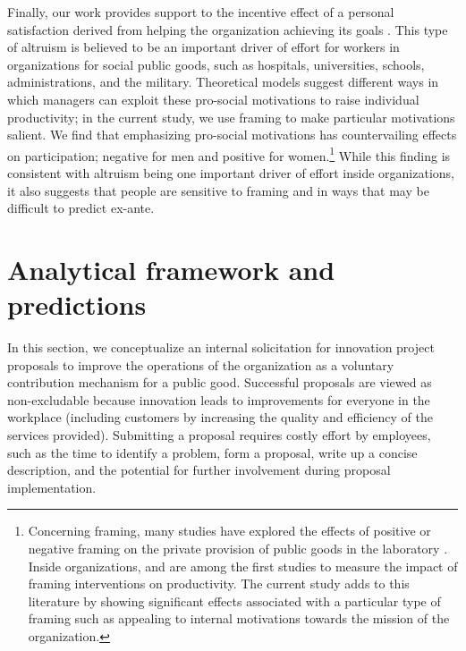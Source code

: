 \documentclass[12pt, titlepage]{article}
\begin{document}
Finally, our work provides support to the incentive effect of a personal
satisfaction derived from helping the organization achieving its goals
\citep{akerlof2005identity, besley2005competition, delfgaauw2005dedicated, delfgaauw2008incentives, prendergast2007motivation}.
This type of altruism is believed to be an important driver of effort
for workers in organizations for social public goods, such as hospitals,
universities, schools, administrations, and the military. Theoretical
models suggest different ways in which managers can exploit these
pro-social motivations to raise individual productivity; in the current
study, we use framing to make particular motivations salient. We find
that emphasizing pro-social motivations has countervailing effects on
participation; negative for men and positive for women.\footnote{Concerning
  framing, many studies have explored the effects of positive or
  negative framing on the private provision of public goods in the
  laboratory \citep{andreoni1995warm}. Inside organizations,
  \citet{hossain2012behavioralist} and \citet{hong2015framing} are among
  the first studies to measure the impact of framing interventions on
  productivity. The current study adds to this literature by showing
  significant effects associated with a particular type of framing such
  as appealing to internal motivations towards the mission of the
  organization.} While this finding is consistent with altruism being
one important driver of effort inside organizations, it also suggests
that people are sensitive to framing and in ways that may be difficult
to predict ex-ante.

\section{Analytical framework and
predictions}\label{analytical-framework-and-predictions}

In this section, we conceptualize an internal solicitation for
innovation project proposals to improve the operations of the
organization as a voluntary contribution mechanism for a public good.
Successful proposals are viewed as non-excludable because innovation
leads to improvements for everyone in the workplace (including customers
by increasing the quality and efficiency of the services provided).
Submitting a proposal requires costly effort by employees, such as the
time to identify a problem, form a proposal, write up a concise
description, and the potential for further involvement during proposal
implementation.
\end{document}
